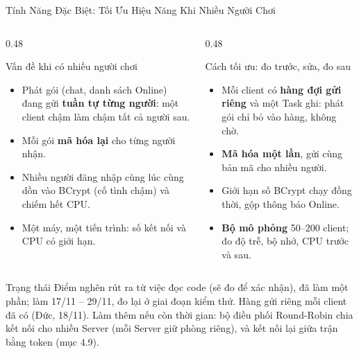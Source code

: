 \begin{frame}[label=dacbiet]{Tính Năng Đặc Biệt: Tối Ưu Hiệu Năng Khi Nhiều Người Chơi}
  \begin{columns}[T]
    \begin{column}{0.48\textwidth}
      \begin{block}{Vấn đề khi có nhiều người chơi}
        \begin{itemize}\setlength{\itemsep}{0pt}
          \item Phát gói (chat, danh sách Online) đang gửi \textbf{tuần tự từng người}: một client chậm làm chậm tất cả người sau.
          \item Mỗi gói \textbf{mã hóa lại} cho từng người nhận.
          \item Nhiều người đăng nhập cùng lúc cùng dồn vào BCrypt (cố tình chậm) và chiếm hết CPU.
          \item Một máy, một tiến trình: số kết nối và CPU có giới hạn.
        \end{itemize}
      \end{block}
    \end{column}
    \begin{column}{0.48\textwidth}
      \begin{block}{Cách tối ưu: đo trước, sửa, đo sau}
        \begin{itemize}\setlength{\itemsep}{0pt}
          \item Mỗi client có \textbf{hàng đợi gửi riêng} và một Task ghi: phát gói chỉ bỏ vào hàng, không chờ.
          \item \textbf{Mã hóa một lần}, gửi cùng bản mã cho nhiều người.
          \item Giới hạn số BCrypt chạy đồng thời, gộp thông báo Online.
          \item \textbf{Bộ mô phỏng} 50--200 client; đo độ trễ, bộ nhớ, CPU trước và sau.
        \end{itemize}
      \end{block}
    \end{column}
  \end{columns}
  \vspace{0.1cm}
  \begin{alertblock}{Trạng thái}
    \footnotesize Điểm nghẽn rút ra từ việc đọc code (sẽ đo để xác nhận), đã làm một phần; làm 17/11 -- 29/11, đo lại ở giai đoạn kiểm thử. Hàng gửi riêng mỗi client đã có (Đức, 18/11). Làm thêm nếu còn thời gian: bộ điều phối Round-Robin chia kết nối cho nhiều Server (mỗi Server giữ phòng riêng), và kết nối lại giữa trận bằng token (mục 4.9).
  \end{alertblock}
\end{frame}

